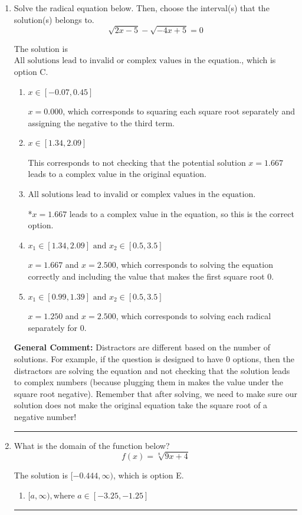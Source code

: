 \documentclass{extbook}[14pt]
\newcommand{\litem}[1]{\item #1

\rule{\textwidth}{0.4pt}}
\begin{document}
\begin{enumerate}\litem{
Solve the radical equation below. Then, choose the interval(s) that the solution(s) belongs to.
\[ \sqrt{2 x - 5} - \sqrt{-4 x + 5} = 0 \]

The solution is \( \text{All solutions lead to invalid or complex values in the equation.} \), which is option C.\begin{enumerate}[label=\Alph*.]
\item \( x \in [-0.07,0.45] \)

$x = 0.000$, which corresponds to squaring each square root separately and assigning the negative to the third term.
\item \( x \in [1.34,2.09] \)

This corresponds to not checking that the potential solution $x = 1.667$ leads to a complex value in the original equation.
\item \( \text{All solutions lead to invalid or complex values in the equation.} \)

*$x = 1.667$ leads to a complex value in the equation, so this is the correct option.
\item \( x_1 \in [1.34, 2.09] \text{ and } x_2 \in [0.5,3.5] \)

$x = 1.667$ and $x = 2.500$, which corresponds to solving the equation correctly and including the value that makes the first square root 0.
\item \( x_1 \in [0.99, 1.39] \text{ and } x_2 \in [0.5,3.5] \)

$x = 1.250$ and $x = 2.500$, which corresponds to solving each radical separately for 0.
\end{enumerate}

\textbf{General Comment:} Distractors are different based on the number of solutions. For example, if the question is designed to have 0 options, then the distractors are solving the equation and not checking that the solution leads to complex numbers (because plugging them in makes the value under the square root negative). Remember that after solving, we need to make sure our solution does not make the original equation take the square root of a negative number!
}
\litem{
What is the domain of the function below?
\[ f(x) = \sqrt[8]{9 x + 4} \]

The solution is \( [-0.444, \infty) \), which is option E.\begin{enumerate}[label=\Alph*.]
\item \( [a, \infty), \text{where } a \in [-3.25, -1.25] \)


\end{enumerate}}
\end{enumerate}
\end{document}
